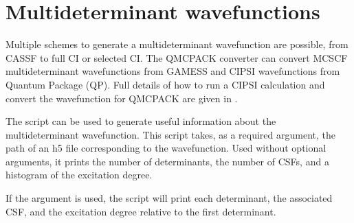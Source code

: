 \documentclass[letterpaper,10pt,english]{sphinxmanual}
\begin{document}
\section{Multideterminant wavefunctions}
\label{\detokenize{intro_wavefunction:multideterminant-wavefunctions}}\label{\detokenize{intro_wavefunction:multideterminants}}
Multiple schemes to generate a multideterminant wavefunction are
possible, from CASSF to full CI or selected CI. The QMCPACK converter can
convert MCSCF multideterminant wavefunctions from
GAMESS  and CIPSI  wavefunctions from
Quantum Package  (QP). Full details of how to run a CIPSI
calculation and convert the wavefunction for QMCPACK are given in
.

The script  can be used to generate
useful information about the multideterminant wavefunction. This script takes, as a required argument, the path of an h5 file corresponding to the wavefunction. Used without optional arguments, it prints the number of determinants, the number of CSFs, and a histogram of the excitation degree.

\begin{sphinxVerbatim}[commandchars=\\\{\}]
  
    
    
    
    
    

 
 
\end{sphinxVerbatim}

If the  argument is used, the script will print each determinant,
the associated CSF, and the excitation degree relative to the first determinant.
\end{document}
